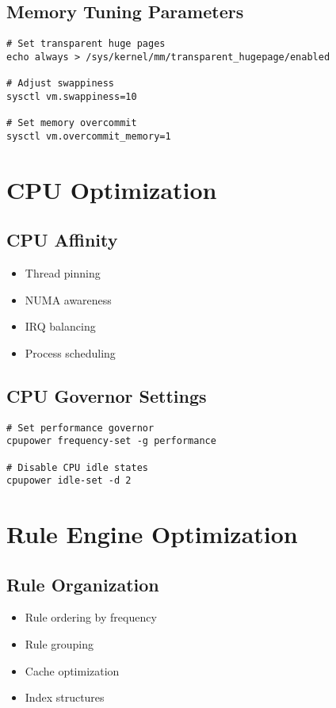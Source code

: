 \documentclass{article}
\begin{document}
\subsection{Memory Tuning Parameters}
\begin{verbatim}
# Set transparent huge pages
echo always > /sys/kernel/mm/transparent_hugepage/enabled

# Adjust swappiness
sysctl vm.swappiness=10

# Set memory overcommit
sysctl vm.overcommit_memory=1
\end{verbatim}

\section{CPU Optimization}

\subsection{CPU Affinity}
\begin{itemize}
    \item Thread pinning
    \item NUMA awareness
    \item IRQ balancing
    \item Process scheduling
\end{itemize}

\subsection{CPU Governor Settings}
\begin{verbatim}
# Set performance governor
cpupower frequency-set -g performance

# Disable CPU idle states
cpupower idle-set -d 2
\end{verbatim}

\section{Rule Engine Optimization}

\subsection{Rule Organization}
\begin{itemize}
    \item Rule ordering by frequency
    \item Rule grouping
    \item Cache optimization
    \item Index structures
\end{itemize}
\end{document}
